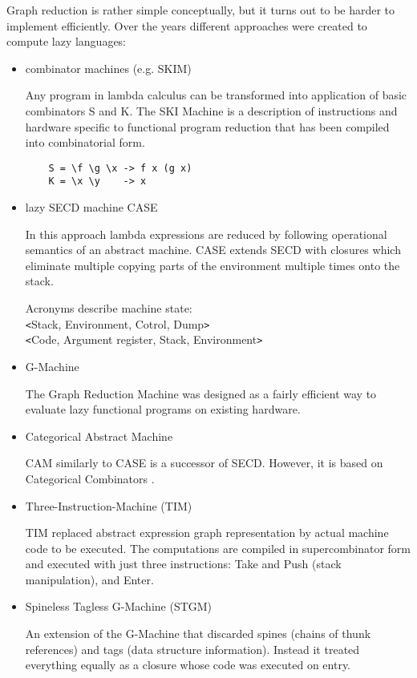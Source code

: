 \documentclass[en]{pracamgr}
\begin{document}
Graph reduction is rather simple conceptually, but it turns
out to be harder to implement efficiently. Over the
years different approaches were created to compute lazy languages: 

\newpage
\begin{itemize}
    \item combinator machines (e.g. SKIM) \cite{combinators} \cite{SKIM}

        Any program in lambda calculus can be transformed into application
        of basic combinators S and K. The SKI Machine is a description
        of instructions and hardware specific to functional program
        reduction that has been compiled into combinatorial form.

        \begin{verbatim}
    S = \f \g \x -> f x (g x)
    K = \x \y    -> x\end{verbatim}

    \item lazy SECD machine CASE \cite{SECDM} \cite{CASE}
    
        In this approach lambda expressions are reduced by following
        operational semantics of an abstract machine. CASE extends SECD
        with closures which eliminate multiple copying parts of the environment
        multiple times onto the stack.
        
        Acronyms describe machine state: \\
        \texttt<Stack, Environment, Cotrol, Dump\texttt> \\
        \texttt<Code, Argument register, Stack, Environment\texttt>
    
    \item G-Machine \cite{G-Machine} \cite{spj-book}
    
        The Graph Reduction Machine was designed as a fairly efficient
        way to evaluate lazy functional programs on existing
        hardware.

    \item Categorical Abstract Machine \cite{CAM}
    
        CAM similarly to CASE is a successor of SECD.
        However, it is based on Categorical Combinators
        \cite{categorical_combinators}.

    \item Three-Instruction-Machine (TIM) \cite{TIM}
    
        TIM replaced abstract expression graph representation
        by actual machine code to be executed.
        The computations are compiled in supercombinator form
        and executed with just three instructions: Take and Push
        (stack manipulation), and Enter.

    \item Spineless Tagless G-Machine (STGM) \cite{STGM}
    
        An extension of the G-Machine that discarded spines
        (chains of thunk references) and tags (data structure information).
        Instead it treated everything equally as a closure
        whose code was executed on entry.

\end{itemize}
\end{document}
